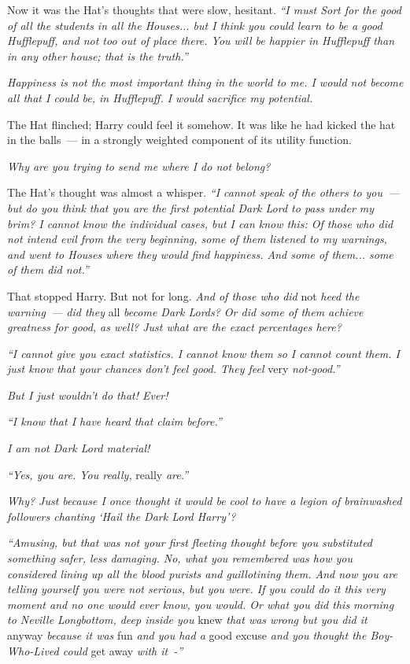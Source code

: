Now it was the Hat's thoughts that were slow, hesitant. \emph{``I must Sort for the good of all the students in all the Houses... but I think you could learn to be a good Hufflepuff, and not too out of place there. You will be happier in Hufflepuff than in any other house; that is the truth.''}

\emph{Happiness is not the most important thing in the world to me. I would not become all that I could be, in Hufflepuff. I would sacrifice my potential.}

The Hat flinched; Harry could feel it somehow. It was like he had kicked the hat in the balls~--- in a strongly weighted component of its utility function.

\emph{Why are you trying to send me where I do not belong?}

The Hat's thought was almost a whisper. \emph{``I cannot speak of the others to you~--- but do you think that you are the first potential Dark Lord to pass under my brim? I cannot know the individual cases, but I can know this: Of those who did not intend evil from the very beginning, some of them listened to my warnings, and went to Houses where they would find happiness. And some of them... some of them did not.''}

That stopped Harry. But not for long. \emph{And of those who did} not \emph{heed the warning~--- did they} all \emph{become Dark Lords? Or did some of them achieve greatness for good, as well? Just what are the exact percentages here?}

\emph{``I cannot give you exact statistics. I cannot know them so I cannot count them. I just know that your chances don't feel good. They feel} very \emph{not-good.''}

\emph{But I just wouldn't do that! Ever!}

\emph{``I know that I have heard that claim before.''}

\emph{I am not Dark Lord material!}

\emph{``Yes, you are. You really,} really \emph{are.''}

\emph{Why? Just because I once thought it would be cool to have a legion of brainwashed followers chanting `Hail the Dark Lord Harry'?}

\emph{``Amusing, but that was not your first fleeting thought before you substituted something safer, less damaging. No, what you remembered was how you considered lining up all the blood purists and guillotining them. And now you are telling yourself you were not serious, but you were. If you could do it this very moment and no one would ever know, you would. Or what you did this morning to Neville Longbottom, deep inside you} knew \emph{that was wrong but you did it} anyway \emph{because it was} fun \emph{and you had a} good excuse \emph{and you thought the Boy-Who-Lived could} get away \emph{with it~-''}

